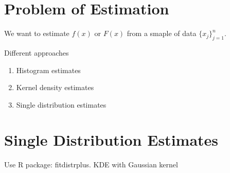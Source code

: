 \documentclass[12pt, a4paper]{report}
\begin{document}
  \section{Problem of Estimation}

  We want to estimate $ f(x) $ or $ F(x) $ from a smaple of data $ \{x_j\}_{j=1}^n. $

  Different approaches

  \begin{enumerate}
    \item Histogram estimates
    \item Kernel density estimates
    \item Single distribution estimates
  \end{enumerate}

  \section{Single Distribution Estimates}

  Use R package: fitdistrplus. KDE with Gaussian kernel
\end{document}
